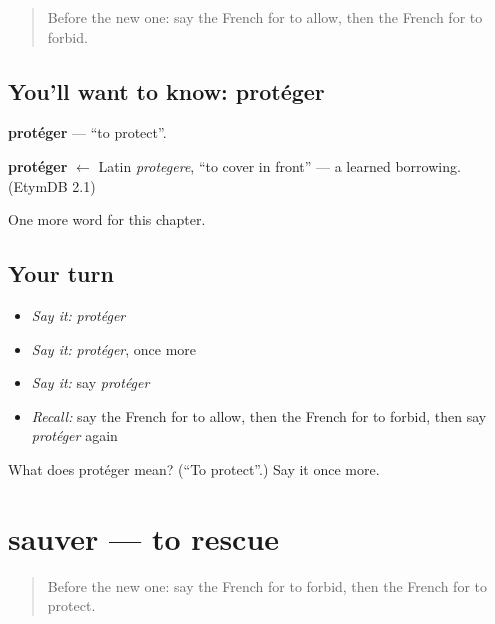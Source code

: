 \label{lesson:FR-C177-proteger}



\begin{quote}
Before the new one: say the French for to allow, then the French for to forbid.
\end{quote}

\subsection*{You'll want to know: protéger}
\textbf{protéger} — \textquotedblleft{}to protect\textquotedblright{}.

\begin{cousinweb}
\textbf{protéger} $\leftarrow$ Latin \emph{protegere}, \textquotedblleft{}to cover in front\textquotedblright{} — a learned borrowing. (EtymDB 2.1)
\end{cousinweb}

\begin{grammarlens}[title={What you've built}]
One more word for this chapter.
\end{grammarlens}

\subsection*{Your turn}
\begin{itemize}
\raggedright
  \item \emph{Say it:} \emph{protéger}
  \item \emph{Say it:} \emph{protéger}, once more
  \item \emph{Say it:} say \emph{protéger}
  \item \emph{Recall:} say the French for to allow, then the French for to forbid, then say \emph{protéger} again
\end{itemize}

\begin{tcolorbox}[breakable,colback=teal!4,colframe=teal!35!black,title={Before you move on}]
What does protéger mean? (\textquotedblleft{}To protect\textquotedblright{}.) Say it once more.
\end{tcolorbox}
\section[sauver]{sauver — to rescue}

\label{lesson:FR-C177-sauver}



\begin{quote}
Before the new one: say the French for to forbid, then the French for to protect.
\end{quote}


